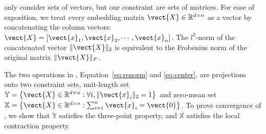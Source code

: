 \citet{zhu2018convergence} only consider sets of vectors, but our constraint
are sets of matrices.  For ease of exposition, we treat every embedding
matrix $\vect{X} \in \mathbb{R}^{d \times n}$ as a vector by concatenating
the column vectors: $\vect{X} = \lbrack \vect{x}_1, \vect{x}_2, \cdots,
\vect{x}_n \rbrack$.  The $l^2$-norm of the concatenated vector $\| \vect{X}
\|_2$ is equivalent to the Frobenius norm of the original matrix $\| \vect{X}
\|_F$.

The two operations in \name{}, Equation~\eqref{eq:renorm} and \eqref{eq:center},
are projections onto two constraint sets, unit-length set $\mathbb{Y} =
\left\lbrace \vect{X} \in \mathbb{R}^{d \times n} : \forall i,
\|\vect{x}_i\|_2=1 \right\rbrace$ and zero-mean set $\mathbb{X} =
\left\lbrace \vect{X}\in\mathbb{R}^{d \times n} : \sum_{i=1}^n \vect{x}_i=\vect{0}
\right\rbrace$.  To prove convergence of \name{}, we show that $\mathbb{Y}$
satisfies the three-point property, and $\mathbb{X}$ satisfies the local
contraction property.

